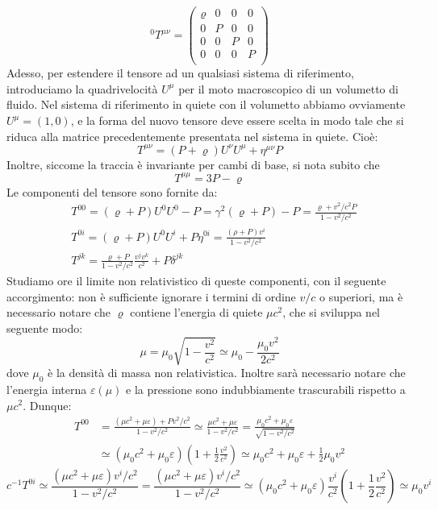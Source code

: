\documentclass[a4paper,11pt]{book}
\theoremstyle{plain}
\theoremstyle{definition}
\begin{document}
\[
^0T^{\mu\nu} =
\left( \begin{array}{cccc}
\varrho & 0 & 0 & 0 \\
0 & P & 0 & 0 \\
0 & 0 & P & 0 \\
0 & 0 & 0 & P \\
\end{array}\right)
\]
Adesso, per estendere il tensore ad un qualsiasi sistema di riferimento, introduciamo la quadrivelocità $U^{\mu}$ per il moto macroscopico di un volumetto di fluido. Nel sistema di riferimento in quiete con il volumetto abbiamo ovviamente $U^{\mu}=(1,0)$, e la forma del nuovo tensore deve essere scelta in modo tale che si riduca alla matrice precedentemente presentata nel sistema in quiete. Cioè:
\begin{equation}
T^{\mu\nu} = (P+\varrho)U^{\nu}U^{\mu}+\eta^{\mu\nu}P
\end{equation}
Inoltre, siccome la traccia è invariante per cambi di base, si nota subito che
\[
T^{\mu\mu} = 3P-\varrho
\]
Le componenti del tensore sono fornite da:
\[
\begin{split}
&T^{00} = (\varrho+P)U^0U^0-P = \gamma^2(\varrho+P)-P= \frac{\varrho+v^2/c^2 P}{1-v^2/c^2} \\
&T^{0i} = (\varrho+P)U^0U^i+P\eta^{0i} = \frac{(\rho+P)v^i}{1-v^2/c^2} \\
&T^{jk} = \frac{\varrho + P}{1-v^2/c^2}\frac{v^jv^k}{c^2}+P\delta^{jk}
\end{split}
\]
Studiamo ore il limite non relativistico di queste componenti, con il seguente accorgimento: non è sufficiente ignorare i termini di ordine $v/c$ o superiori, ma è necessario notare che $\varrho$ contiene l'energia di quiete $\mu c^2$, che si sviluppa nel seguente modo:
\[
\mu = \mu_0\sqrt{1-\frac{v^2}{c^2}} \simeq \mu_0 -\frac{\mu_0v^2}{2c^2}
\]
dove $\mu_0$ è la densità di massa non relativistica. Inoltre sarà necessario notare che l'energia interna $\varepsilon(\mu)$ e la pressione sono indubbiamente trascurabili rispetto a $\mu c^2$. Dunque:
\begin{align*}
T^{00} &= \frac{(\mu c^2+\mu\varepsilon)+Pv^2/c^2}{1-v^2/c^2} \simeq \frac{\mu c^2+\mu\varepsilon}{1-v^2/c^2} = \frac{\mu_0c^2+\mu_0\varepsilon}{\sqrt{1-v^2/c^2}} \\
&\simeq (\mu_0c^2+\mu_0\varepsilon)\left( 1+\frac{1}{2}\frac{v^2}{c^2} \right) \simeq \mu_0c^2 +\mu_0\varepsilon + \frac{1}{2}\mu_0v^2
\end{align*}
\[
c^{-1}T^{0i} \simeq \frac{(\mu c^2+\mu\varepsilon)v^i/c^2}{1-v^2/c^2} = \frac{(\mu c^2+\mu\varepsilon)v^i/c^2}{1-v^2/c^2} \simeq (\mu_0c^2+\mu_0\varepsilon)\frac{v^i}{c^2}\left(1+\frac{1}{2}\frac{v^2}{c^2} \right) \simeq \mu_0 v^i
\]
\end{document}
